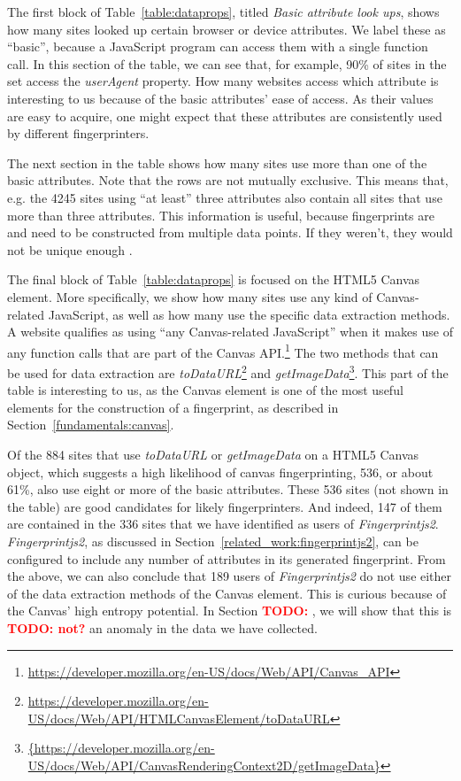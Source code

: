 \documentclass[
    fontsize=12pt,
    headings=small,
    parskip=half,
    bibliography=totoc,
    numbers=noenddot,
    open=any
    ]{scrreprt}
\newcommand{\todo}[1]{\textcolor{red}{\textbf{TODO: #1}}}
\begin{document}
The first block of Table~\ref{table:dataprops}, titled \textit{Basic attribute look ups},
shows how many sites looked up certain browser or device attributes.
We label these as ``basic'', because a JavaScript program can access them with a single function
call. In this section of the table, we can see that, for example, 90\% of sites in the set access the
\textit{userAgent} property.
How many websites access which attribute is interesting to us because of the basic attributes' ease of access.
As their values are easy to acquire, one might expect that these attributes are consistently used by different fingerprinters.

The next section in the table shows how many sites use more than one of the basic attributes.
Note that the rows are not mutually exclusive. This means that, e.g. the 4245 sites using ``at least'' three
attributes also contain all sites that use more than three attributes.
This information is useful, because fingerprints are and need to be constructed from
multiple data points. If they weren't, they would not be unique enough \cite{panopticlick}.

The final block of Table~\ref{table:dataprops} is focused on the HTML5 Canvas element.
More specifically, we show how many sites use any kind of Canvas-related JavaScript,
as well as how many use the specific data extraction methods.
A website qualifies as using ``any Canvas-related JavaScript'' when it makes use
of any function calls that are part of the Canvas API.\footnote{\url{https://developer.mozilla.org/en-US/docs/Web/API/Canvas_API}}
The two methods that can be used for data extraction are
\textit{toDataURL}\footnote{\url{https://developer.mozilla.org/en-US/docs/Web/API/HTMLCanvasElement/toDataURL}}
and
\textit{getImageData}\footnote{\url{{https://developer.mozilla.org/en-US/docs/Web/API/CanvasRenderingContext2D/getImageData}}}.
This part of the table is interesting to us, as the Canvas element is one of the
most useful elements for the construction of a fingerprint, as described
in Section~\ref{fundamentals:canvas}.

Of the 884 sites that use \textit{toDataURL} or \textit{getImageData} on a HTML5 Canvas object, which suggests
a high likelihood of canvas fingerprinting, 536, or about 61\%, also use eight or more of the basic attributes.
These 536 sites (not shown in the table) are good candidates for likely fingerprinters.
And indeed, 147 of them are contained in the 336 sites that we have identified as users of \textit{Fingerprintjs2}.
\textit{Fingerprintjs2}, as discussed in Section~\ref{related_work:fingerprintjs2},
can be configured to include any number of attributes
in its generated fingerprint. From the above, we can also conclude that 189 users of \textit{Fingerprintjs2}
do not use either of the data extraction methods of the Canvas element. This is curious because
of the Canvas' high entropy potential.
In Section \todo{}, we will show that this is \todo{not?} an anomaly in the data we have collected.
\end{document}

